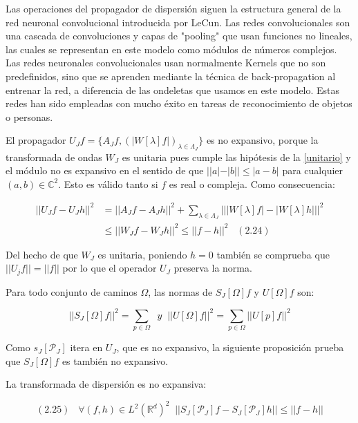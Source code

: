 Las operaciones del propagador de dispersión siguen la estructura general de la red neuronal convolucional introducida por LeCun. Las redes convolucionales son una cascada de convoluciones y capas de "pooling" que usan funciones no lineales, las cuales se representan en este modelo como módulos de números complejos. Las redes neuronales convolucionales usan normalmente Kernels que no son predefinidos, sino que se aprenden mediante la técnica de back-propagation al entrenar la red, a diferencia de las ondeletas que usamos en este modelo. Estas redes han sido empleadas con mucho éxito en tareas de reconocimiento de objetos o personas.

\noindent El propagador $U_Jf=\lbrace A_Jf, \left(\left| W[\lambda]f\right|\right)_{\lambda\in\Lambda_J} \rbrace$ es no expansivo, porque la transformada de ondas $W_J$ es unitaria pues cumple las hipótesis de la \autoref{unitario} y el módulo no es expansivo en el sentido de que $||a|-|b||\leq |a-b|$ para cualquier $(a,b)\in \mathbb{C}^2$. Esto es válido tanto si $f$ es real o compleja. Como consecuencia: 

\begin{align*} 
    ||U_J f-U_J h||^2 &= ||A_J f-A_J h||^2+\sum_{\lambda\in\Lambda_J} \left| \left| |W[\lambda]f|-|W[\lambda]h| \right| \right|^2 \\
    &\leq \left| \left| W_J f- W_J h \right| \right|^2 \leq ||f-h||^2 \;\;\; (2.24)
\end{align*}

\noindent Del hecho de que $W_J$ es unitaria, poniendo $h=0$ también se comprueba que $||U_j f||=||f||$ por lo que el operador $U_J$ preserva la norma.

\medskip

\noindent Para todo conjunto de caminos $\Omega$, las normas de $S_J[\Omega]f$ y $U[\Omega]f$ son: 

$$\left|\left| S_J[\Omega]f \right|\right|^2=\sum_{p\in\Omega} \;\; y \;\; \left|\left|U[\Omega]f\right|\right|^2=\sum_{p\in\Omega} \left|\left| U[p]f\right|\right|^2$$

\noindent Como $s_J[\mathcal{P}_J]$ itera en $U_J$, que es no expansivo, la siguiente proposición prueba que $S_J[\Omega]f$ es también no expansivo. 

\begin{proposicion}
La transformada de dispersión es no expansiva: 

$$(2.25) \;\;\; \forall (f,h)\in L^2(\mathbb{R}^d)^2 \;\; ||S_J[\mathcal{P}_J]f-S_J[\mathcal{P}_J]h|| \leq ||f-h||$$
\end{proposicion}

